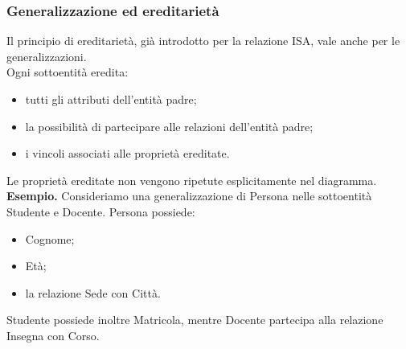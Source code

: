 \subsubsection*{Generalizzazione ed ereditarietà}
Il principio di ereditarietà, già introdotto
per la relazione ISA, vale anche
per le generalizzazioni.\\
Ogni sottoentità eredita:
\begin{itemize}
    \item tutti gli attributi dell'entità padre;
    \item la possibilità di partecipare
    alle relazioni dell'entità padre;
    \item i vincoli associati alle proprietà ereditate.
\end{itemize}
\noindent
Le proprietà ereditate non vengono ripetute
esplicitamente nel diagramma.\\
\textcolor{verdeEsempio}{\textbf{Esempio.}}
Consideriamo una generalizzazione di Persona
nelle sottoentità Studente e Docente.
Persona possiede:
\begin{itemize}
    \item Cognome;
    \item Età;
    \item la relazione Sede con Città.
\end{itemize}
\noindent
Studente possiede inoltre Matricola,
mentre Docente partecipa alla relazione
Insegna con Corso.
